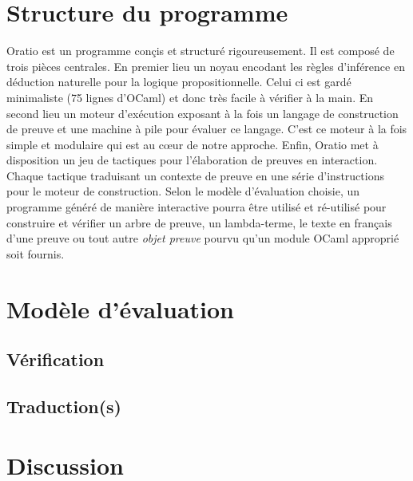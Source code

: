 \documentclass{article}
\begin{document}
\section{Structure du programme}

Oratio est un programme conçis et structuré rigoureusement. Il est composé de trois pièces centrales.
En premier lieu un noyau encodant les règles d'inférence en déduction naturelle pour la logique propositionnelle. Celui ci est gardé minimaliste (75 lignes d'OCaml) et donc très facile à vérifier à la main. En second lieu un moteur d'exécution exposant à la fois un langage de construction de preuve et une machine à pile pour évaluer ce langage. C'est ce moteur à la fois simple et modulaire qui est au c\oe{}ur de notre approche. Enfin, Oratio met à disposition un jeu de tactiques pour l'élaboration de preuves en interaction. Chaque tactique traduisant un contexte de preuve en une série d'instructions pour le moteur de construction. Selon le modèle d'évaluation choisie, un programme généré de manière interactive pourra être utilisé et ré-utilisé pour construire et vérifier un arbre de preuve, un lambda-terme, le texte en français d'une preuve ou tout autre \textit{objet preuve} pourvu qu'un module OCaml approprié soit fournis.

\section{Modèle d'évaluation}

\subsection{Vérification}

\subsection{Traduction(s)}

\section{Discussion}
\end{document}
